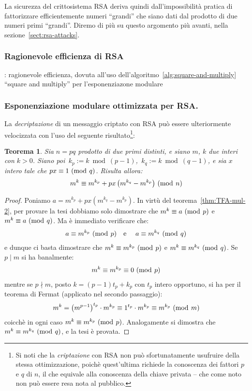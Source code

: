 \documentclass[pdflatex,11pt,a4paper,oneside]{article}
\let\OldEmph\emph
\renewcommand{\emph}[1]{\OldEmph{#1\/}}
\newcommand{\XXX}[1][XXX]{\text{\bfseries{\color{red}{\emph{#1}}}}}
\newcommand{\TODO}[0]{\XXX[TODO]}
\newcommand{\p}[1]{\left({#1}\right)}
\newcommand{\divides}[0]{\mid}
\newcommand{\notdivides}[0]{\nmid}
\newcommand{\congruent}[0]{\equiv}
\newcommand{\mmodop}[0]{\ensuremath{\operatorname{mod}}}
\newcommand{\mmod}[1]{\ensuremath{\allowbreak\ (\mmodop\:{#1})}}
\newcommand{\rem}[2]{\ensuremath{{#1}\:\mmodop\:{#2}}}
\newtheorem{theorem}[TheoremLike]{Teorema}
\begin{document}
La sicurezza del crittosistema RSA deriva quindi dall'impossibilit\`a
pratica di fattorizzare efficientemente numeri ``grandi'' che siano
dati dal prodotto di due numeri primi ``grandi''.  Diremo di pi\`u su
questo argomento pi\`u avanti, nella sezione~\eqref{sect:rsa-attacks}.

\subsubsection{Ragionevole efficienza di RSA}
\TODO: ragionevole efficienza, dovuta all'uso
       dell'algoritmo~\eqref{alg:square-and-multiply}
       ``square and multiply'' per l'esponenziazone modulare

\subsubsection{Esponenziazione modulare ottimizzata per RSA.}

La \emph{decriptazione} di un messaggio criptato con RSA pu\`o essere
ulteriormente velocizzata con l'uso del seguente risultato\footnote{Si
noti che la \emph{criptazione} con RSA non pu\`o sfortunatamente
usufruire della stessa ottimizzazione, poich\`e quest'ultima richiede
la conoscenza dei fattori $p$ e $q$ di $n$, il che equivale alla
conoscenza della chiave privata -- che come noto non pu\`o essere resa
nota al pubblico.}:
%
\begin{theorem}\label{thm:modular-exponentation-rsa-optimization}
Sia $n = pq$ prodotto di due primi distinti, e siano $m$, $k$ due
interi con $k > 0$.  Siano poi \,$k_p := \rem{k}{(p-1)}$,
\,$k_q := \rem{k}{(q-1)}$, e sia $x$ intero tale che
$px \congruent 1 \mmod q$. Risulta allora:
\begin{displaymath}
  m^k \congruent m^{k_p} + px\,\big(m^{k_q} - m^{k_p}\big)\mmod n
\end{displaymath}
\end{theorem}
%
\begin{proof}
Poniamo $a = m^{k_p} + px\p{m^{k_q} - m^{k_p}}$.  In virt\`u del
teorema~\eqref{thm:TFA-mul-2}, per provare la tesi dobbiamo solo
dimostrare che $m^k \congruent a \mmod p$ e $m^k \congruent a \mmod q$.
Ma \`e immediato verificare che:
\begin{displaymath}
  a \congruent m^{k_p} \mmod p
    \text{\quad e \quad}
  a \congruent m^{k_q} \mmod q
\end{displaymath}
e dunque ci basta dimostrare che $m^k \congruent m^{k_p} \mmod p$ e
$m^k \congruent m^{k_q} \mmod q$. Se $p \divides m$ si ha banalmente:
\begin{displaymath}
  m^k \congruent m^{k_p} \congruent 0 \mmod p
\end{displaymath}
mentre se $p \notdivides m$, posto $k = (p - 1)t_p + k_p$ con $t_p$ intero
opportuno, si ha per il teorema di Fermat (applicato nel secondo
passaggio):
\begin{displaymath}
  m^k = \p{m^{p-1}}^{t_p} \cdot m^{k_p} \congruent 1^{t_p} \cdot m^{k_p}
      \congruent m^{k_p} \mmod m
\end{displaymath}
coicch\`e in ogni caso $m^k \congruent m^{k_p} \mmod p$. Analogamente si
dimostra che $m^k \congruent m^{k_q} \mmod q$, e la tesi \`e provata.
\end{proof}
\end{document}
